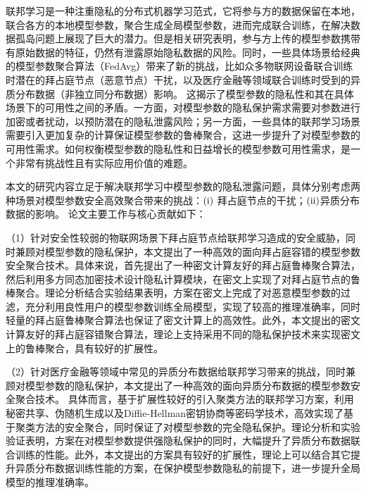 \begin{cabstract}
联邦学习是一种注重隐私的分布式机器学习范式，它将参与方的数据保留在本地，联合各方的本地模型参数，聚合生成全局模型参数，进而完成联合训练，在解决数据孤岛问题上展现了巨大的潜力。但是相关研究表明，参与方上传的模型参数携带有原始数据的特征，仍然有泄露原始隐私数据的风险。同时，一些具体场景给经典的模型参数聚合算法（FedAvg）带来了新的挑战，比如众多物联网设备联合训练时潜在的拜占庭节点（恶意节点）干扰，以及医疗金融等领域联合训练时受到的异质分布数据（非独立同分布数据）影响。
这揭示了模型参数的隐私性和其在具体场景下的可用性之间的矛盾。一方面，对模型参数的隐私保护需求需要对参数进行加密或者扰动，以预防潜在的隐私泄露风险；另一方面，一些具体的联邦学习场景需要引入更加复杂的计算保证模型参数的鲁棒聚合，这进一步提升了对模型参数的可用性需求。如何权衡模型参数的隐私性和日益增长的模型参数可用性需求，是一个非常有挑战性且有实际应用价值的难题。

本文的研究内容立足于解决联邦学习中模型参数的隐私泄露问题，具体分别考虑两种场景对模型参数安全高效聚合带来的挑战：$(\rm \romannumeral1)$ 拜占庭节点的干扰；$(\rm \romannumeral2)$异质分布数据的影响。
论文主要工作与核心贡献如下：

（1）针对安全性较弱的物联网场景下拜占庭节点给联邦学习造成的安全威胁，同时兼顾对模型参数的隐私保护，本文提出了一种高效的面向拜占庭容错的模型参数安全聚合技术。具体来说，首先提出了一种密文计算友好的拜占庭鲁棒聚合算法，然后利用多方同态加密技术设计隐私计算模块，在密文上实现了对拜占庭节点的鲁棒聚合。理论分析结合实验结果表明，方案在密文上完成了对恶意模型参数的过滤，充分利用良性用户的模型参数训练全局模型，实现了较高的推理准确率，同时轻量的拜占庭鲁棒聚合算法也保证了密文计算上的高效性。此外，本文提出的密文计算友好的拜占庭容错聚合算法，理论上支持采用不同的隐私保护技术来实现密文上的鲁棒聚合，具有较好的扩展性。

（2）针对医疗金融等领域中常见的异质分布数据给联邦学习带来的挑战，同时兼顾对模型参数的隐私保护，本文提出了一种高效的面向异质分布数据的模型参数安全聚合技术。
具体而言，基于扩展性较好的引入聚类方法的联邦学习方案，利用秘密共享、伪随机生成以及Diffie-Hellman密钥协商等密码学技术，高效实现了基于聚类方法的安全聚合，同时保证了对模型参数的完全隐私保护。理论分析和实验验证表明，方案在对模型参数提供强隐私保护的同时，大幅提升了异质分布数据联合训练的性能。此外，本文提出的方案具有较好的扩展性，理论上可以结合其它提升异质分布数据训练性能的方案，在保护模型参数隐私的前提下，进一步提升全局模型的推理准确率。


\end{cabstract}
